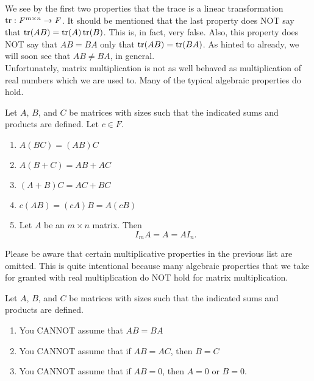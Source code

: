 We see by the first two properties that the trace is a linear transformation $\operatorname*{tr} : F^{m\times n} \to F$. It should be mentioned that the last property does NOT say that $\operatorname*{tr}(AB) = \operatorname*{tr}(A)\operatorname*{tr}(B)$. This is, in fact, very false. Also, this property does NOT say that $AB=BA$ only that $\operatorname*{tr}(AB) = \operatorname*{tr}(BA)$. As hinted to already, we will soon see that $AB \neq BA$, in general. \\ 

Unfortunately, matrix multiplication is not as well behaved as multiplication of real numbers which we are used to. Many of the typical algebraic properties do hold.\\

\begin{Thm} Let $A$, $B$, and $C$ be matrices with sizes such that the indicated sums and products are defined. Let $c\in F$.
\begin{multicols}{2}
\begin{enumerate}[!THM!, start=1]
\item $A(BC) = (AB)C$\\
\item $A(B+C) = AB + AC$\\
\item $(A+B)C = AC + BC$\\
\item $c(AB) = (cA)B = A(cB)$\\
\item Let $A$ be an $m\times n$ matrix. Then \[I_mA = A = AI_n.\] \mbox{}
\end{enumerate}
\end{multicols}
\end{Thm}\vspace{-0.15 in}

Please be aware that certain multiplicative properties in the previous list are omitted. This is quite intentional because many algebraic properties that we take for granted with real multiplication do NOT hold for matrix multiplication.\\

\begin{Thm}\label{thm:cantmultiply} Let $A$, $B$, and $C$ be matrices with sizes such that the indicated sums and products are defined.
\begin{enumerate}[!THM!, start=1]
\item\label{item:cantmultiplycommute} You CANNOT assume that $AB = BA$\\
\item You CANNOT assume that if $AB=AC$, then $B = C$\\
\item You CANNOT assume that if $AB = 0$, then $A =0$ or $B=0$.
\end{enumerate}
\end{Thm}


